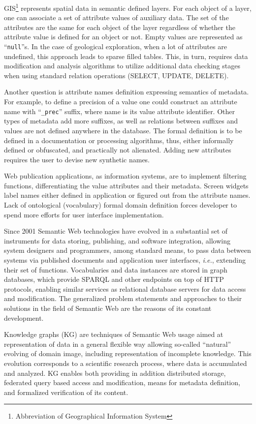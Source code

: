 \documentclass[
]{ceurart}
\begin{document}
GIS\footnote{Abbreviation of Geographical Information System} represents spatial data in semantic defined layers.  For each object of a layer, one can associate a set of attribute values of auxiliary data.  The set of the attributes are the same for each object of the layer regardless of whether the attribute value is defined for an object or not.  Empty values are represented as ``\texttt{null}''s.  In the case of geological exploration, when a lot of attributes are undefined, this approach leads to sparse filled tables.  This, in turn, requires data modification and analysis algorithms to utilize additional data checking stages when using standard relation operations (SELECT, UPDATE, DELETE).

Another question is attribute names definition expressing semantics of metadata.  For example, to define a precision of a value one could construct an attribute name with ``\texttt{\_prec}'' suffix, where name is its value attribute identifier.  Other types of metadata add more suffixes, as well as relations between suffixes and values are not defined anywhere in the database.  The formal definition is to be defined in a documentation or processing algorithms, thus, either informally defined or obfuscated, and practically not alienated.  Adding new attributes requires the user to devise new synthetic names.

Web publication applications, as information systems, are to implement filtering functions, differentiating the value attributes and their metadata.  Screen widgets label names either defined in application or figured out from the attribute names.  Lack of ontological (vocabulary) formal domain definition forces developer to spend more efforts for user interface implementation.

Since 2001 Semantic Web technologies have evolved in a substantial set of instruments for data storing, publishing, and software integration, allowing system designers and programmers, among standard means, to pass data between systems via published documents and application user interfaces, \emph{i.e.}, extending their set of functions.  Vocabularies and data instances are stored in graph databases, which provide SPARQL and other endpoints on top of HTTP protocols, enabling similar services as relational database servers for data access and modification.  The generalized problem statements and approaches to their solutions in the field of Semantic Web are the reasons of its constant development.

Knowledge graphs (KG) \cite{hogan} are techniques of Semantic Web usage aimed at representation of data in a general flexible way allowing so-called ``natural'' evolving of domain image, including representation of incomplete knowledge.  This evolution corresponds to a scientific research process, where data is accumulated and analyzed.  KG enables both providing in addition distributed storage, federated query based access and modification, means for metadata definition, and formalized verification of its content.
\end{document}
